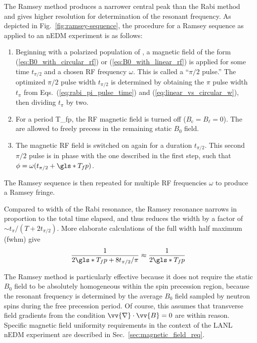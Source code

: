 The Ramsey method produces a narrower central peak than the Rabi method and gives higher resolution for determination of the resonant frequency. As depicted in Fig.~\ref{fig:ramsey-sequence}, the procedure for a Ramsey sequence as applied to an nEDM experiment is as follows:
%
\begin{enumerate}
    \item Beginning with a polarized population of \ucn, a magnetic field of the form (\ref{eq:B0_with_circular_rf}) or (\ref{eq:B0_with_linear_rf}) is applied for some time $t_{\pi/2}$ and a chosen RF frequency $\omega$. This is called a ``$\pi/2$ pulse.'' The optimized $\pi/2$ pulse width $t_{\pi/2}$ is determined by obtaining the $\pi$ pulse width $t_\pi$ from Eqs.~(\ref{eq:rabi_pi_pulse_time}) and (\ref{eq:linear_vs_circular_w}), then dividing $t_\pi$ by two.
    \item For a period \gls{T_fp}, the RF magnetic field is turned off ($B_\text{c}=B_\ell=0$). The \ucn are allowed to freely precess in the remaining static $B_0$ field.
    \item The magnetic RF field is switched on again for a duration $t_{\pi/2}$. This second $\pi/2$ pulse is in phase with the one described in the first step, such that $\phi = \omega ( t_{\pi/2} + \gls*{T_fp})$.
\end{enumerate}
%
The Ramsey sequence is then repeated for multiple RF frequencies $\omega$ to produce a Ramsey fringe.

Compared to width of the Rabi resonance, the Ramsey resonance narrows in proportion to the total time elapsed, and thus reduces the width by a factor of $\sim t_{\pi} / (T+2t_{\pi/2})$. More elaborate calculations of the full width half maximum (\acrshort*{fwhm}) give~\cite{may_thesis, pendlebury_revised_2015}
%
\begin{gather}
    \frac{1}{2 \gls*{T_fp}+8 t_{\pi/2} / \pi} \approx \frac{1}{2\gls*{T_fp}}
\end{gather}

The Ramsey method is particularly effective because it does not require the static $B_0$ field to be absolutely homogeneous within the spin precession region, because the resonant frequency is determined by the average $B_0$ field sampled by neutron spins during the free precession period. Of course, this assumes that transverse field gradients from the condition $\vv{\nabla}\cdot \vv{B}=0$ are within reason. Specific magnetic field uniformity requirements in the context of the LANL nEDM experiment are described in Sec.~\ref{sec:magnetic_field_req}.

